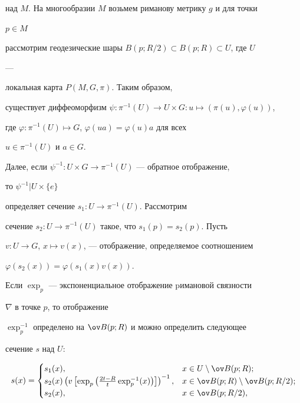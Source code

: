 над $M$. На многообразии $M$ возьмем риманову метрику $g$ и для точки 


$p\in M$ 


рассмотрим геодезические шары $B(p;R/2)\subset B(p;R)\subset U$, где $U$ 


--- 


локальная карта $P(M,G,\pi)$. Таким образом, 


существует диффеоморфизм $\psi:\pi^{-1}(U)\to U\times G:u\mapsto 


(\pi(u),\varphi(u))$, 


где $\varphi:\pi^{-1}(U)\mapsto G$, $\varphi(u a)=\varphi(u)a$ для всех 


$u\in\pi^{-1}(U)$ и $a\in G$. 


 


Далее, если $\psi^{-1}:U\times G\to\pi^{-1}(U)$ --- обратное отображение, 


то $\psi^{-1}|U\times\{e\}$ 


определяет сечение $s_1:U\to\pi^{-1}(U)$. Рассмотрим 


сечение $s_2:U\to\pi^{-1}(U)$ такое, что $s_1(p)=s_2(p)$. Пусть


$v:U\to G$, $x\mapsto v(x)$, --- отображение, определяемое соотношением


$\varphi(s_2(x))=\varphi(s_1(x)v(x))$. 


Если $\exp_p$ --- экспоненциальное отображение pимановой связности 


$\nabla$ в точке $p$, то отображение


$\exp^{-1}_p$ определено на $\ov B(p;R)$ и можно определить следующее 


сечение $s$ над $U$: 


\begin{equation} 


s(x)= 


\begin{cases} 


s_1(x), & x\in U\setminus\ov B(p;R); \\ 


s_2(x)\left(v\left[\exp_p\left(\frac{2t-R}{t} 


\exp^{-1}_p(x)\right)\right]\right)^{-1}, & x\in\ov B(p;R) 


\setminus\ov B(p;R/2); \\ 


s_2(x), & x\in\ov B(p;R/2), 


\end{cases} 


\end{equation} 


